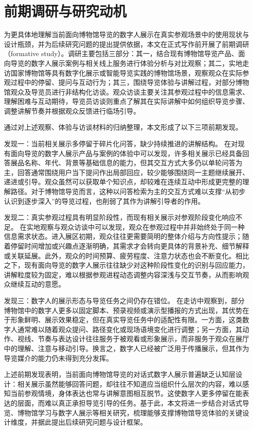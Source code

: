 \section{前期调研与研究动机}
为更具体地理解当前面向博物馆导览的数字人展示在真实参观场景中的使用现状与设计瓶颈，并为后续研究问题的提出提供依据，本文在正式写作前开展了前期调研（formative study）。调研主要包括三部分：其一，结合现有博物馆导览产品、面向导览的数字人展示案例与相关线上服务进行体验分析与对比观察；其二，实地走访国家博物馆等具有数字化展示或智能导览实践的博物馆场景，观察观众在实际参观过程中的停留、提问与互动行为；其三，围绕导览体验与讲解过程，对部分博物馆观众及导览员进行非结构化访谈。观众访谈主要关注其参观过程中的信息需求、理解困难与互动期待，导览员访谈则重点了解其在实际讲解中如何组织导览步骤、调整讲解节奏并根据观众反馈进行临场引导。

通过对上述观察、体验与访谈材料的归纳整理，本文形成了以下三项前期发现。

发现一：当前相关展示多停留于碎片化问答，缺少持续推进的讲解结构。
在对现有面向导览的数字人展示产品与案例的体验中可以发现，许多相关展示已经具备回答展品名称、年代、背景等基础信息的能力，但其交互方式大多仍以单轮问答为主，回答通常围绕用户当下提问作出局部回应，较少能够围绕同一主题继续展开、递进或引导。观众虽然可以获取单个知识点，却较难在连续互动中形成更完整的理解路径。对于博物馆导览而言，这种以问答检索为主的交互方式难以支撑“从初步认识到逐步深入”的导览过程，也削弱了其作为讲解引导者的作用。

发现二：真实参观过程具有明显阶段性，而现有相关展示对参观阶段变化响应不足。
在实地观察与观众访谈中可以发现，观众在参观过程中并非始终处于同一种信息需求状态。进入展区初期，观众往往更需要简明的整体介绍与方向性提示；随着停留时间增加或兴趣点逐渐明确，其需求才会转向更具体的背景补充、细节解释或关联延展。此外，观众的时间预算、疲劳程度、注意力状态也会不断变化。相比之下，现有面向导览的数字人展示往往缺少对这种阶段性变化的识别与回应能力，讲解粒度较为固定，难以根据参观进程动态调整内容深浅与交互节奏，从而影响观众继续互动的意愿。

发现三：数字人的展示形态与导览任务之间仍存在错位。
在走访中观察到，部分博物馆中的数字人更多以固定脚本、预录视频或演示型播报的方式出现，其优势在于形象鲜明、展示效果稳定，但在真实导览任务中的适配性有限。一方面，这类数字人通常难以随着观众提问、路径变化或现场语境变化进行调整；另一方面，其动作、视线、节奏与表达设计往往服务于被观看或形象展示，而非服务于观众在展厅中的理解、注意与移动引导。换言之，数字人已经被广泛用于传播展示，但其作为导览媒介的能力仍未得到充分发挥。

上述前期发现表明，当前面向博物馆导览的对话式数字人展示普遍缺乏认知层设计：相关展示虽然能够回答问题，却往往不知道应当组织什么层次的内容，难以感知当前参观情境，身体表达也常与讲解意图相互脱节。这使数字人更多停留在能表达的层面，而难以真正承担导览引导的任务。基于此，本文将进一步结合对话式导览、博物馆学习与数字人展示等相关研究，梳理能够支撑博物馆导览体验的关键设计维度，并据此提出后续研究问题与设计框架。


